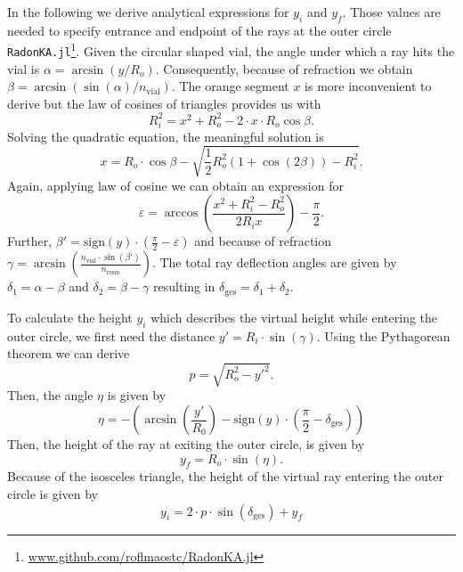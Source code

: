 \documentclass{article}
\begin{document}
\noindent In the following we derive analytical expressions for $y_i$ and $y_f$. 
Those values are needed to specify entrance and endpoint of the rays at the outer circle \texttt{RadonKA.jl}\footnote{\url{www.github.com/roflmaostc/RadonKA.jl}}.
Given the circular shaped vial, the angle under which a ray hits the vial is $\alpha = \arcsin(y / R_o)$. Consequently, because of refraction we obtain $\beta=\arcsin(\sin(\alpha) / n_\text{vial})$.
The orange segment $x$ is more inconvenient to derive but the law of cosines of triangles provides us with 
\begin{equation}
    R_i^2 = x^2 + R_o^2 - 2 \cdot x \cdot R_o \cos{\beta}.
\end{equation}
Solving the quadratic equation, the meaningful solution is
\begin{equation}
    x = R_o \cdot \cos{\beta} -  \sqrt{\frac12 R_o^2 (1+\cos(2\beta)) - R_i^2}.
\end{equation}
Again, applying law of cosine we can obtain an expression for
\begin{equation}
    \varepsilon = \arccos\left(\frac{x^2 + R_i^2 - R_o^2}{2 R_i x}\right) - \frac{\pi}{2}.
\end{equation}
Further, $\beta'=\mathrm{sign}(y) \cdot (\frac{\pi}{2}- \varepsilon)$ and because of refraction $\gamma=\arcsin(\frac{n_\text{vial} \cdot \sin(\beta')}{n_\text{resin}})$. 
The total ray deflection angles are given by $\delta_1=\alpha - \beta$ and $\delta_2=\beta-\gamma$ resulting in $\delta_\text{ges} = \delta_1 + \delta_2$. 

\noindent
To calculate the height $y_i$ which describes the virtual height while entering the outer circle, we first need the distance $y' = R_i \cdot \sin(\gamma)$.
Using the Pythagorean theorem we can derive
\begin{equation}
    p = \sqrt{R_o^2-y'^2}.
\end{equation}
Then, the angle $\eta$ is given by
\begin{equation}
    \eta =- \left(\arcsin\left(\frac{y'}{R_0}\right) - \text{sign}(y) \cdot \left(\frac{\pi}{2}-\delta_{\text{ges}}\right)\right)
\end{equation}
Then, the height of the ray at exiting the outer circle, is given by 
\begin{equation}
    y_f = R_o \cdot \sin(\eta). 
\end{equation}
Because of the isosceles triangle, the height of the virtual ray entering the outer circle is given by
\begin{equation}
    y_i =  2\cdot p \cdot \sin(\delta_\text{ges}) + y_f 
\end{equation}
\end{document}
